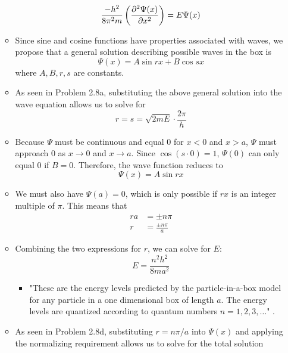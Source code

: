 \documentclass[../notes.tex]{subfiles}
\begin{document}
\begin{itemize}
\begin{itemize}
        \begin{equation*}
            \frac{-h^2}{8\pi^2m}\left( \pdv[2]{\Psi(x)}{x} \right) = E\Psi(x)
        \end{equation*}
        \item Since sine and cosine functions have properties associated with waves, we propose that a general solution describing possible waves in the box is
        \begin{equation*}
            \Psi(x) = A\sin rx+B\cos sx
        \end{equation*}
        where $A,B,r,s$ are constants.
        \item As seen in Problem 2.8a, substituting the above general solution into the wave equation allows us to solve for
        \begin{equation*}
            r = s = \sqrt{2mE}\cdot\frac{2\pi}{h}
        \end{equation*}
        \item Because $\Psi$ must be continuous and equal 0 for $x<0$ and $x>a$, $\Psi$ must approach 0 as $x\to 0$ and $x\to a$. Since $\cos(s\cdot 0)=1$, $\Psi(0)$ can only equal 0 if $B=0$. Therefore, the wave function reduces to
        \begin{equation*}
            \Psi(x) = A\sin rx
        \end{equation*}
        \item We must also have $\Psi(a)=0$, which is only possible if $rx$ is an integer multiple of $\pi$. This means that
        \begin{align*}
            ra &= \pm n\pi\\
            r &= \frac{\pm n\pi}{a}
        \end{align*}
        \item Combining the two expressions for $r$, we can solve for $E$:
        \begin{equation*}
            E = \frac{n^2h^2}{8ma^2}
        \end{equation*}
        \begin{itemize}
            \item "These are the energy levels predicted by the particle-in-a-box model for any particle in a one dimensional box of length $a$. The energy levels are quantized according to quantum numbers $n=1,2,3,\dots$" \parencite[17]{bib:MiesslerFischerTarr}.
        \end{itemize}
        \item As seen in Problem 2.8d, substituting $r=n\pi/a$ into $\Psi(x)$ and applying the normalizing requirement allows us to solve for the total solution

\end{itemize}
\end{itemize}
\end{document}
